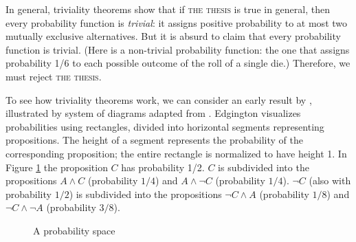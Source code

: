 In general, triviality theorems show that if  \textsc{the thesis} is true in general, then every probability function is \emph{trivial}: it assigns positive probability to at most two mutually exclusive alternatives.  But it is absurd to claim that every probability function is trivial.  (Here is a non-trivial probability function: the one that assigns probability 1/6 to each possible outcome of the roll of a single die.) Therefore, we must reject \textsc{the thesis}.

To see how triviality theorems work, we can consider an early result by \citet{lewis-conditional-i}, illustrated by system of diagrams adapted from \citet{edgington-conditionals}.  Edgington visualizes probabilities using rectangles, divided into horizontal segments representing propositions.  The height of a segment represents the probability of the corresponding proposition; the entire rectangle is normalized to have height 1.  In Figure \ref{fig-probability} the proposition $C$ has probability 1/2.  $C$ is subdivided into the propositions $A \wedge C$ (probability $1/4$) and  $A \wedge \neg C$ (probability $1/4$). $\neg C$ (also with probability $1/2$) is subdivided into the propositions $\neg C \wedge A$ (probability $1/8$) and $\neg C \wedge \neg A$ (probability $3/8$).

\begin{figure}
\centering
{}
\caption{A probability space}
\label{fig-probability}
\end{figure}

